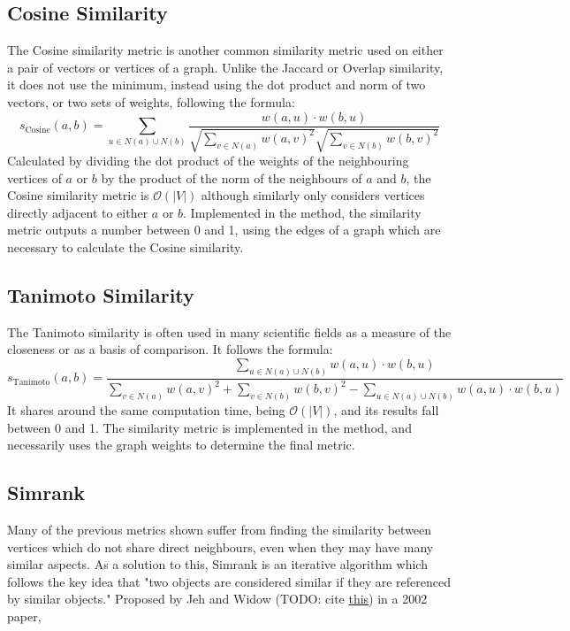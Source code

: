 \documentclass[fontsize=11pt]{article}
\begin{document}
\subsection{Cosine Similarity}
The Cosine similarity metric is another common similarity metric used on either a pair of vectors or vertices of a graph. Unlike the Jaccard or Overlap similarity, it does not use the minimum, instead using the dot product and norm of two vectors, or two sets of weights, following the formula:
\[
s_{\text{Cosine}}(a, b) = \sum_{u \in N(a) \cup N(b)} \frac{w(a, u) \cdot w(b, u)}{\sqrt{\sum_{v \in N(a)}w(a, v)^2}\sqrt{\sum_{v \in N(b)}w(b, v)^2}}
\]
Calculated by dividing the dot product of the weights of the neighbouring vertices of $a$ or $b$ by the product of the norm of the neighbours of $a$ and $b$, the Cosine similarity metric is $\mathcal{O}(\lvert V \rvert)$ although similarly only considers vertices directly adjacent to either $a$ or $b$. Implemented in the  method, the similarity metric outputs a number between 0 and 1, using the edges of a graph which are necessary to calculate the Cosine similarity. 

\subsection{Tanimoto Similarity}
The Tanimoto similarity is often used in many scientific fields as a measure of the closeness or as a basis of comparison. It follows the formula:
\[
s_{\text{Tanimoto}}(a, b) = \frac{\sum_{u \in N(a) \cup N(b)} w(a, u) \cdot w(b, u)}{\sum_{v \in N(a)}w(a, v)^2 + \sum_{v \in N(b)}w(b, v)^2 - \sum_{u \in N(a) \cup N(b)} w(a, u) \cdot w(b, u)}
\]
It shares around the same computation time, being $\mathcal{O}(\lvert V \rvert)$, and its results fall between 0 and 1. The similarity metric is implemented in the  method, and necessarily uses the graph weights to determine the final metric. 

\subsection{Simrank}
Many of the previous metrics shown suffer from finding the similarity between vertices which do not share direct neighbours, even when they may have many similar aspects. As a solution to this, Simrank is an iterative algorithm which follows the key idea that "two objects are considered similar if they are referenced by similar objects." Proposed by Jeh and Widow (\color{red}TODO: cite \href{https://www.cse.cuhk.edu.hk/~cslui/CMSC5734/simrank.pdf}{this}\color{black}) in a 2002 paper, 
\end{document}
